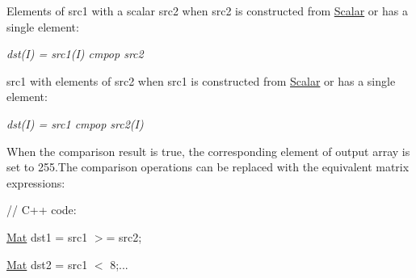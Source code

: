 \begin{DoxyItemize}
\item Elements of {\ttfamily src1} with a scalar {\ttfamily src2} when {\ttfamily src2} is constructed from {\ttfamily \mbox{\hyperlink{classorg_1_1opencv_1_1core_1_1_scalar}{Scalar}}} or has a single element\+: 
\end{DoxyItemize}

{\itshape dst(\+I) = src1(\+I) cmpop src2}


\begin{DoxyItemize}
\item {\ttfamily src1} with elements of {\ttfamily src2} when {\ttfamily src1} is constructed from {\ttfamily \mbox{\hyperlink{classorg_1_1opencv_1_1core_1_1_scalar}{Scalar}}} or has a single element\+: 
\end{DoxyItemize}

{\itshape dst(\+I) = src1 cmpop src2(\+I)}

When the comparison result is true, the corresponding element of output array is set to 255.\+The comparison operations can be replaced with the equivalent matrix expressions\+: {\ttfamily }

{\ttfamily }

{\ttfamily }

{\ttfamily // C++ code\+:}

{\ttfamily }

{\ttfamily }

{\ttfamily \mbox{\hyperlink{classorg_1_1opencv_1_1core_1_1_mat}{Mat}} dst1 = src1 $>$= src2;}

{\ttfamily }

{\ttfamily }

{\ttfamily \mbox{\hyperlink{classorg_1_1opencv_1_1core_1_1_mat}{Mat}} dst2 = src1 $<$ 8;...}

{\ttfamily }


